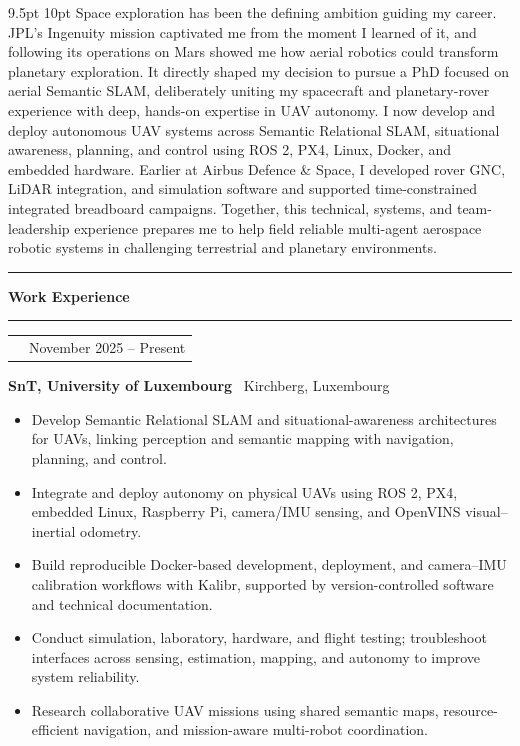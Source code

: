 \documentclass[10pt,a4paper]{article}
\makeatletter
\newcommand{\StatementSize}{9.5pt}
\newcommand{\SectionSize}{11.5pt}
\newcommand{\RoleSize}{10.3pt}
\newcommand{\CompanySize}{9.6pt}
\newcommand{\DurationSize}{9pt}
\newcommand{\BodySize}{9.2pt}
\newcommand{\StatementLineSize}{10pt}
\newcommand{\SectionLineSize}{12pt}
\newcommand{\RoleLineSize}{11.5pt}
\newcommand{\CompanyLineSize}{10.8pt}
\newcommand{\DurationLineSize}{9pt}
\newcommand{\BodyLineSize}{11pt}
\newcommand{\HeaderAfter}{-5pt}
\newcommand{\StatementAfter}{4pt}
\newcommand{\SectionBefore}{4pt}
\newcommand{\SectionTitleToLine}{2pt}
\newcommand{\SectionLineToEntry}{0pt}
\newcommand{\EntryBefore}{0pt}
\newcommand{\RoleToCompany}{-5pt}
\newcommand{\CompanyToBullets}{3pt}
\newcommand{\EntryAfter}{6pt}
\newcommand{\BulletSpacing}{2pt}
\newcommand{\BulletBefore}{0pt}
\newcommand{\BulletIndent}{1.25em}
\newcommand{\SubsectionLineThickness}{0.4pt}
\newcommand{\CVLineThickness}{0.5pt}
\newcommand{\DurationWidth}{4.5cm}
\newcommand{\CVLine}{
    \vspace{\HeaderAfter}
    \noindent
    \textcolor{CVBlack}{
        \rule{\textwidth}{\CVLineThickness}
    }
    \vspace{\HeaderAfter}
}
\newcommand{\CVFirstSection}[1]{

    \vspace{\SectionBefore}


    {\fontsize{\SectionSize}{\SectionLineSize}
    \selectfont
    \textbf{\textcolor{CVBlack}{#1}}}

    \vspace{\SectionTitleToLine}


    \noindent
    \textcolor{CVLightGray}{
        \rule{\textwidth}{\SubsectionLineThickness}
    }

    \vspace{\SectionLineToEntry}
}
\newcommand{\CVEntry}[5]{

    \vspace{\EntryBefore}


    \noindent
    \begin{tabularx}{\textwidth}{
        @{}
        >{\raggedright\arraybackslash}X
        >{\raggedleft\arraybackslash}p{\DurationWidth}
        @{}
    }

        {\fontsize{\RoleSize}{\RoleLineSize}
        \selectfont
        \textbf{\textcolor{CVBlack}{#1}}}
        &
        {\fontsize{\DurationSize}{\DurationLineSize}
        \selectfont
        \textcolor{CVGray}{#4}}

    \end{tabularx}

    \vspace{\RoleToCompany}


    \noindent
    {\fontsize{\CompanySize}{\CompanyLineSize}
    \selectfont
    \textbf{\textcolor{CVDarkGray}{#2}}
    \textcolor{CVGray}{\textbar\ #3}}

    \vspace{\CompanyToBullets}


    \begin{itemize}[
        leftmargin=\BulletIndent,
        itemsep=\BulletSpacing,
        topsep=\BulletBefore,
        parsep=0pt,
        partopsep=0pt
    ]
        #5
    \end{itemize}

    \vspace{\EntryAfter}
}
\newcommand{\CVBullet}[1]{
    \item
    {\fontsize{\BodySize}{\BodyLineSize}
    \selectfont
    \textcolor{CVDarkGray}{#1}}
}
\makeatother
\begin{document}
{
    \fontsize
    {\StatementSize}
    {\StatementLineSize}
    \selectfont
    \textcolor{CVDarkGray}
    {
        Space exploration has been the defining ambition guiding my career. JPL's
        Ingenuity mission captivated me from the moment I learned of it, and following
        its operations on Mars showed me how aerial robotics could transform planetary
        exploration. It directly shaped my decision to pursue a PhD focused on aerial
        Semantic SLAM, deliberately uniting my spacecraft and planetary-rover
        experience with deep, hands-on expertise in UAV autonomy. I now develop and
        deploy autonomous UAV systems across Semantic Relational SLAM, situational
        awareness, planning, and control using ROS 2, PX4, Linux, Docker, and embedded
        hardware. Earlier at Airbus Defence \& Space, I developed rover GNC, LiDAR
        integration, and simulation software and supported time-constrained integrated
        breadboard campaigns. Together, this technical, systems, and team-leadership
        experience prepares me to help field reliable multi-agent aerospace robotic
        systems in challenging terrestrial and planetary environments.
    }
}

\vspace{\StatementAfter}

\CVLine


\CVFirstSection{Work Experience}

\CVEntry
{Doctoral Researcher -- Autonomous UAV Systems}
{SnT, University of Luxembourg}
{Kirchberg, Luxembourg}
{November 2025 -- Present}
{
    \CVBullet{Develop Semantic Relational SLAM and situational-awareness architectures for UAVs, linking perception and semantic mapping with navigation, planning, and control.}

    \CVBullet{Integrate and deploy autonomy on physical UAVs using ROS 2, PX4, embedded Linux, Raspberry Pi, camera/IMU sensing, and OpenVINS visual--inertial odometry.}

    \CVBullet{Build reproducible Docker-based development, deployment, and camera--IMU calibration workflows with Kalibr, supported by version-controlled software and technical documentation.}

    \CVBullet{Conduct simulation, laboratory, hardware, and flight testing; troubleshoot interfaces across sensing, estimation, mapping, and autonomy to improve system reliability.}

    \CVBullet{Research collaborative UAV missions using shared semantic maps, resource-efficient navigation, and mission-aware multi-robot coordination.}
}
\end{document}
